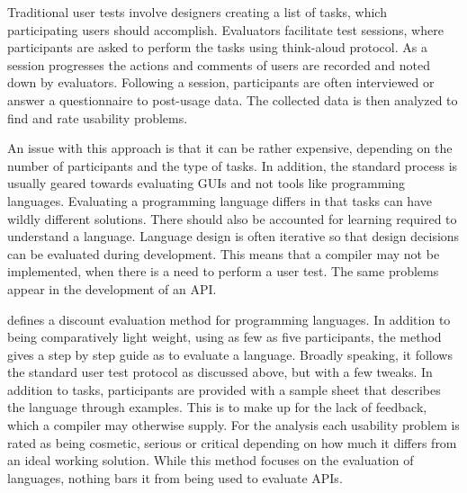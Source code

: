 Traditional user tests involve designers creating a list of tasks, which participating users should accomplish.
Evaluators facilitate test sessions, where participants are asked to perform the tasks using think-aloud protocol.
As a session progresses the actions and comments of users are recorded and noted down by evaluators.
Following a session, participants are often interviewed or answer a questionnaire to post-usage data.
The collected data is then analyzed to find and rate usability problems.

An issue with this approach is that it can be rather expensive, depending on the number of participants and the type of tasks.
In addition, the standard process is usually geared towards evaluating \glspl{GUI} and not tools like programming languages.
Evaluating a programming language differs in that tasks can have wildly different solutions.
There should also be accounted for learning required to understand a language.
Language design is often iterative so that design decisions can be evaluated during development.
This means that a compiler may not be implemented, when there is a need to perform a user test.
The same problems appear in the development of an \gls{API}.

\cite{kurtev2016discount} defines a discount evaluation method for programming languages.
In addition to being comparatively light weight, using as few as five participants, the method gives a step by step guide as to evaluate a language.
Broadly speaking, it follows the standard user test protocol as discussed above, but with a few tweaks.
In addition to tasks, participants are provided with a sample sheet that describes the language through examples.
This is to make up for the lack of feedback, which a compiler may otherwise supply.
For the analysis each usability problem is rated as being cosmetic, serious or critical depending on how much it differs from an ideal working solution.
While this method focuses on the evaluation of languages, nothing bars it from being used to evaluate \glspl{API}.

